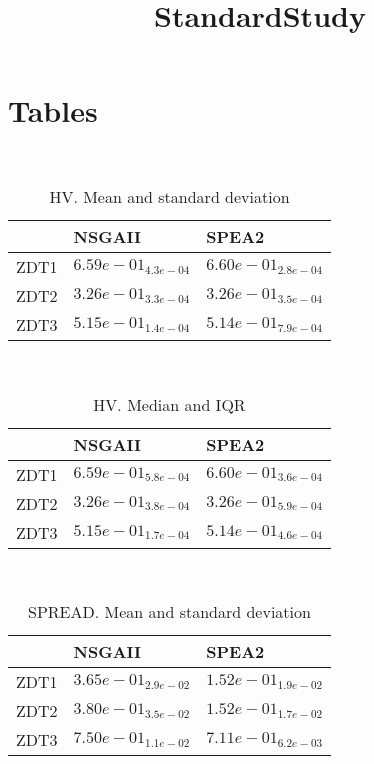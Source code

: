 \documentclass{article}
\title{StandardStudy}
\author{}
\begin{document}
\maketitle
\section{Tables}
\
\begin{table}
\caption{HV. Mean and standard deviation}
\label{table:mean.HV}
\centering
\begin{scriptsize}
\begin{tabular}{lll}
\hline & NSGAII &  SPEA2\\
\hline
ZDT1 & \cellcolor{gray25}$  6.59e-01_{ 4.3e-04}$ & \cellcolor{gray95}$  6.60e-01_{ 2.8e-04}$ \\
ZDT2 & \cellcolor{gray25}$  3.26e-01_{ 3.3e-04}$ & \cellcolor{gray95}$  3.26e-01_{ 3.5e-04}$ \\
ZDT3 & \cellcolor{gray95}$  5.15e-01_{ 1.4e-04}$ & $  5.14e-01_{ 7.9e-04}$ \\
\hline
\end{tabular}
\end{scriptsize}
\end{table}
\
\begin{table}
\caption{HV. Median and IQR}
\label{table:median.HV}
\begin{scriptsize}
\centering
\begin{tabular}{lll}
\hline & NSGAII &  SPEA2\\
\hline
ZDT1 & \cellcolor{gray25}$  6.59e-01_{ 5.8e-04}$ & \cellcolor{gray95}$  6.60e-01_{ 3.6e-04}$ \\
ZDT2 & \cellcolor{gray25}$  3.26e-01_{ 3.8e-04}$ & \cellcolor{gray95}$  3.26e-01_{ 5.9e-04}$ \\
ZDT3 & \cellcolor{gray95}$  5.15e-01_{ 1.7e-04}$ & $  5.14e-01_{ 4.6e-04}$ \\
\hline
\end{tabular}
\end{scriptsize}
\end{table}
\
\begin{table}
\caption{SPREAD. Mean and standard deviation}
\label{table:mean.SPREAD}
\centering
\begin{scriptsize}
\begin{tabular}{lll}
\hline & NSGAII &  SPEA2\\
\hline
ZDT1 & \cellcolor{gray25}$  3.65e-01_{ 2.9e-02}$ & \cellcolor{gray95}$  1.52e-01_{ 1.9e-02}$ \\
ZDT2 & \cellcolor{gray25}$  3.80e-01_{ 3.5e-02}$ & \cellcolor{gray95}$  1.52e-01_{ 1.7e-02}$ \\
ZDT3 & \cellcolor{gray25}$  7.50e-01_{ 1.1e-02}$ & \cellcolor{gray95}$  7.11e-01_{ 6.2e-03}$ \\
\hline
\end{tabular}
\end{scriptsize}
\end{table}
\end{document}
